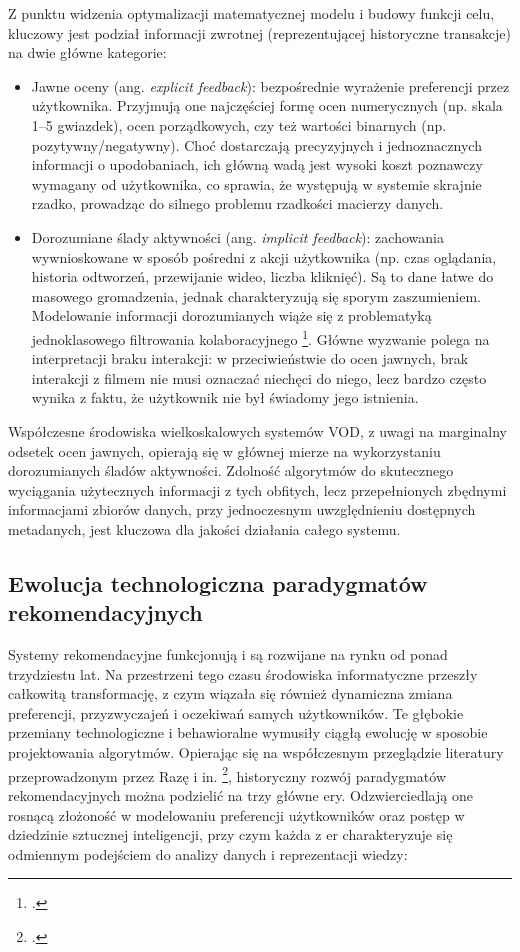 Z punktu widzenia optymalizacji matematycznej modelu i budowy funkcji celu, kluczowy jest podział informacji zwrotnej (reprezentującej historyczne transakcje) na dwie główne kategorie:

\begin{itemize}
    \item Jawne oceny (ang. \foreignlanguage{english}{\textit{explicit feedback}}): bezpośrednie wyrażenie preferencji przez użytkownika. Przyjmują one najczęściej formę ocen numerycznych (np. skala 1--5 gwiazdek), ocen porządkowych, czy też wartości binarnych (np. pozytywny/negatywny). Choć dostarczają precyzyjnych i jednoznacznych informacji o upodobaniach, ich główną wadą jest wysoki koszt poznawczy wymagany od użytkownika, co sprawia, że występują w systemie skrajnie rzadko, prowadząc do silnego problemu rzadkości macierzy danych.

    \item Dorozumiane ślady aktywności (ang. \foreignlanguage{english}{\textit{implicit feedback}}): zachowania wywnioskowane w sposób pośredni z akcji użytkownika (np. czas oglądania, historia odtworzeń, przewijanie wideo, liczba kliknięć). Są to dane łatwe do masowego gromadzenia, jednak charakteryzują się sporym zaszumieniem. Modelowanie informacji dorozumianych wiąże się z problematyką jednoklasowego filtrowania kolaboracyjnego \footcite{rendleBPRBayesianPersonalized2009}. Główne wyzwanie polega na interpretacji braku interakcji: w przeciwieństwie do ocen jawnych, brak interakcji z filmem nie musi oznaczać niechęci do niego, lecz bardzo często wynika z faktu, że użytkownik nie był świadomy jego istnienia.
\end{itemize}

Współczesne środowiska wielkoskalowych systemów VOD, z uwagi na marginalny odsetek ocen jawnych, opierają się w głównej mierze na wykorzystaniu dorozumianych śladów aktywności. Zdolność algorytmów do skutecznego wyciągania użytecznych informacji z tych obfitych, lecz przepełnionych zbędnymi informacjami zbiorów danych, przy jednoczesnym uwzględnieniu dostępnych metadanych, jest kluczowa dla jakości działania całego systemu.

\subsection{Ewolucja technologiczna paradygmatów rekomendacyjnych} %

Systemy rekomendacyjne funkcjonują i są rozwijane na rynku od ponad trzydziestu lat. Na przestrzeni tego czasu środowiska informatyczne przeszły całkowitą transformację, z czym wiązała się również dynamiczna zmiana preferencji, przyzwyczajeń i oczekiwań samych użytkowników. Te głębokie przemiany technologiczne i behawioralne wymusiły ciągłą ewolucję w sposobie projektowania algorytmów. Opierając się na współczesnym przeglądzie literatury przeprowadzonym przez Razę i in. \footcite{razaComprehensiveReviewRecommender2024}, historyczny rozwój paradygmatów rekomendacyjnych można podzielić na trzy główne ery. Odzwierciedlają one rosnącą złożoność w modelowaniu preferencji użytkowników oraz postęp w dziedzinie sztucznej inteligencji, przy czym każda z er charakteryzuje się odmiennym podejściem do analizy danych i reprezentacji wiedzy:

